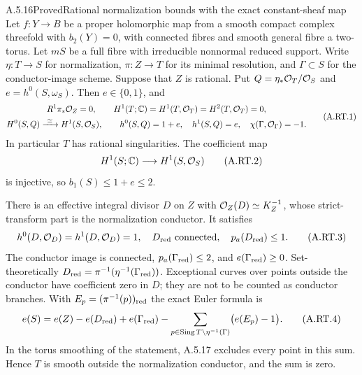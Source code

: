 
\begin{statement}{A.5.16}{Proved}{Rational normalization bounds with the exact constant-sheaf map}
Let $f:Y\to B$ be a proper holomorphic map from a smooth compact
complex threefold with $b_2(Y)=0$, with connected fibres and smooth
general fibre a two-torus. Let $mS$ be a full fibre with irreducible
nonnormal reduced support. Write $\eta:T\to S$ for normalization,
$\pi:Z\to T$ for its minimal resolution, and $\Gamma\subset S$
for the conductor-image scheme. Suppose that $Z$ is rational.
Put $Q=\eta_*\mathcal O_T/\mathcal O_S$ and $e=h^0(S,\omega_S)$.
Then $e\in\{0,1\}$, and
\[
\begin{gathered}
 R^1\pi_*\mathcal O_Z=0,\qquad
 H^1(T;\mathbb C)=H^1(T,\mathcal O_T)=H^2(T,\mathcal O_T)=0,\\
 H^0(S,Q)\xrightarrow{\ \simeq\ }H^1(S,\mathcal O_S),\qquad
 h^0(S,Q)=1+e,\quad h^1(S,Q)=e,\quad
 \chi(\Gamma,\mathcal O_\Gamma)=-1.
\end{gathered}
\tag{A.RT.1}
\]
In particular $T$ has rational singularities. The coefficient map
\[
 H^1(S;\mathbb C)\longrightarrow H^1(S,\mathcal O_S)
\tag{A.RT.2}
\]
is injective, so $b_1(S)\le1+e\le2$.

There is an effective integral divisor $D$ on $Z$ with
$\mathcal O_Z(D)\simeq K_Z^{-1}$, whose strict-transform part is the
normalization conductor. It satisfies
\[
 h^0(D,\mathcal O_D)=h^1(D,\mathcal O_D)=1,
 \quad D_{\rm red}\text{ connected},
 \quad p_a(D_{\rm red})\le1.
\tag{A.RT.3}
\]
The conductor image is connected,
$p_a(\Gamma_{\rm red})\le2$, and
$e(\Gamma_{\rm red})\ge0$. Set-theoretically
$D_{\rm red}=\pi^{-1}(\eta^{-1}(\Gamma_{\rm red}))$.
Exceptional curves over points outside the conductor have
coefficient zero in $D$; they are not to be counted as conductor
branches. With $E_p=(\pi^{-1}(p))_{\rm red}$ the exact Euler
formula is
\[
 e(S)=e(Z)-e(D_{\rm red})+e(\Gamma_{\rm red})
       -\sum_{p\in\operatorname{Sing}T\setminus\eta^{-1}(\Gamma)}
                  \bigl(e(E_p)-1\bigr).
\tag{A.RT.4}
\]
In the torus smoothing of the statement, A.5.17 excludes
every point in this sum. Hence $T$ is smooth outside the
normalization conductor, and the sum is zero.
\end{statement}

